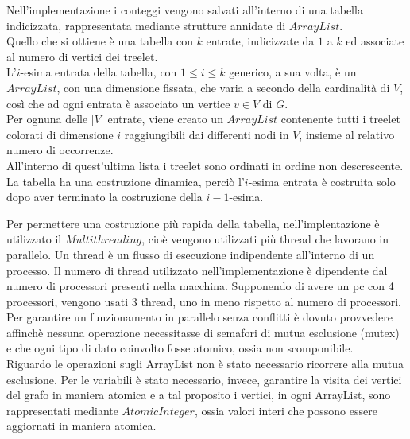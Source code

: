 Nell'implementazione i conteggi vengono salvati all'interno di una tabella indicizzata, rappresentata mediante strutture annidate di $ ArrayList $.\\
Quello che si ottiene \`e una tabella con $ k $ entrate, indicizzate da $ 1 $ a $ k $ ed associate al numero di vertici dei treelet.\\
L'$ i $-esima entrata della tabella, con $ 1\le i \le k $ generico, a sua volta, \`e un $ ArrayList $, con una dimensione fissata, che varia a secondo della cardinalit\`a di $ V $, cos\`i che ad ogni entrata \`e associato un vertice $ v\in V $ di $ G $.\\
Per ognuna delle $ |V| $ entrate, viene creato un $ ArrayList $ contenente tutti i treelet colorati di dimensione $ i $ raggiungibili dai differenti nodi in $ V $, insieme al relativo numero di occorrenze.\\
All'interno di quest'ultima lista i treelet sono ordinati in ordine non descrescente.\\
La tabella ha una costruzione dinamica, perci\`o l'$ i $-esima entrata \`e costruita solo dopo aver terminato la costruzione della $ i-1 $-esima.

Per permettere una costruzione pi\`u rapida della tabella, nell'implentazione \`e utilizzato il $ Multithreading $, cio\`e vengono utilizzati pi\`u thread che lavorano in parallelo.
Un thread \`e un flusso di esecuzione indipendente all'interno di un processo.
Il numero di thread utilizzato nell'implementazione \`e dipendente dal numero di processori presenti nella macchina.
Supponendo di avere un pc con 4 processori, vengono usati 3 thread, uno in meno rispetto al numero di processori.
Per garantire un funzionamento in parallelo senza conflitti \`e dovuto provvedere affinch\`e nessuna operazione necessitasse di semafori di mutua esclusione (mutex) e che ogni tipo di dato coinvolto fosse atomico, ossia non scomponibile.\\
Riguardo le operazioni sugli ArrayList non \`e stato necessario ricorrere alla mutua esclusione.
Per le variabili \`e stato necessario, invece, garantire la visita dei vertici del grafo in maniera atomica e a tal proposito i vertici, in ogni ArrayList, sono rappresentati mediante $ AtomicInteger $, ossia valori interi che possono essere aggiornati in maniera atomica.\mbox{}\\

